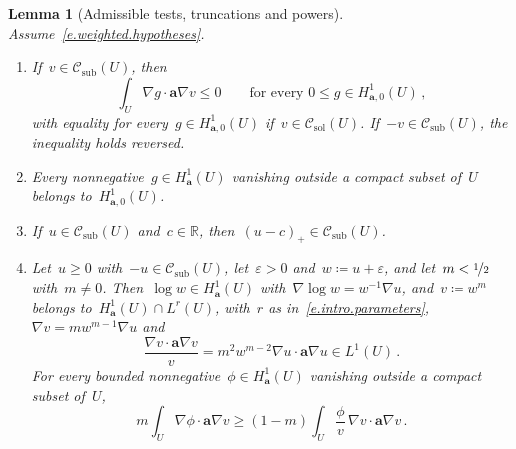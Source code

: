 \documentclass[11pt,letterpaper]{article}
\numberwithin{equation}{section}
\newtheorem{lemma}[theorem]{Lemma}
\theoremstyle{definition}
\newcommand{\R}{\mathbb{R}}
\renewcommand{\a}{\mathbf{a}}
\newcommand{\eps}{\varepsilon}
\newcommand{\nf}{\nicefrac}
\newcommand{\Hzero}[1]{H^1_{#1,0}}
\newcommand{\Csol}{\mathcal C_{\mathrm{sol}}}
\newcommand{\Csub}{\mathcal C_{\mathrm{sub}}}
\begin{document}
\begin{lemma}[Admissible tests, truncations and powers]
\label{l.weighted.testing}
Assume~\eqref{e.weighted.hypotheses}.
\begin{enumerate}[label=\textup{(\roman*)}]
\item\label{i.testing.admissible} If~$v\in\Csub(U)$, then
\begin{equation}
	\int_U\nabla g\cdot\a\nabla v\leq0\qquad\mbox{for every }0\leq g\in\Hzero{\a}(U)\,,
	\label{e.weighted.testing}
\end{equation}
with equality for every~$g\in\Hzero{\a}(U)$ if~$v\in\Csol(U)$. If~$-v\in\Csub(U)$, the inequality holds reversed.
\item\label{i.testing.compact} Every nonnegative~$g\in H^1_\a(U)$ vanishing outside a compact subset of~$U$ belongs to~$\Hzero{\a}(U)$.
\item\label{i.testing.truncation} If~$u\in\Csub(U)$ and~$c\in\R$, then~$(u-c)_+\in\Csub(U)$.
\item\label{i.testing.powers} Let~$u\geq0$ with~$-u\in\Csub(U)$, let~$\eps>0$ and~$w\coloneqq u+\eps$, and let~$m<\nf12$ with~$m\neq0$. Then~$\log w\in H^1_\a(U)$ with~$\nabla\log w=w^{-1}\nabla u$, and~$v\coloneqq w^m$ belongs to~$H^1_\a(U)\cap L^r(U)$, with~$r$ as in~\eqref{e.intro.parameters},~$\nabla v=mw^{m-1}\nabla u$ and
\begin{equation}
	\frac{\nabla v\cdot\a\nabla v}{v}=m^2w^{m-2}\nabla u\cdot\a\nabla u\in L^1(U)\,.
	\label{e.power.source}
\end{equation}
For every bounded nonnegative~$\phi\in H^1_\a(U)$ vanishing outside a compact subset of~$U$,
\begin{equation}
	m\int_U\nabla\phi\cdot\a\nabla v\geq(1-m)\int_U\frac\phi v\,\nabla v\cdot\a\nabla v\,.
	\label{e.power.testing}
\end{equation}
\end{enumerate}
\end{lemma}
\end{document}
